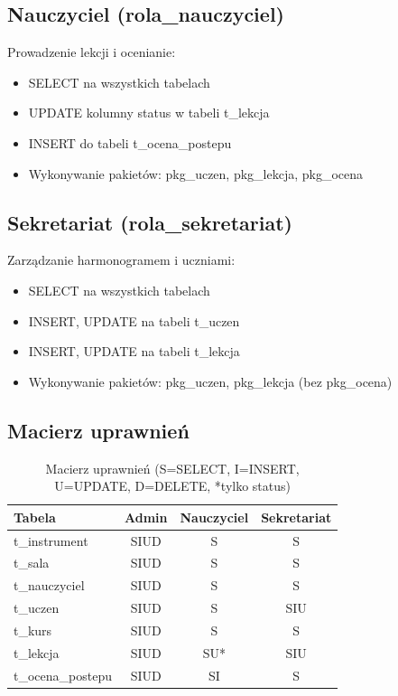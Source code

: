 \documentclass[12pt,a4paper]{article}
\begin{document}
\subsection{Nauczyciel (rola\_nauczyciel)}

Prowadzenie lekcji i ocenianie:
\begin{itemize}[nosep]
    \item SELECT na wszystkich tabelach
    \item UPDATE kolumny status w tabeli t\_lekcja
    \item INSERT do tabeli t\_ocena\_postepu
    \item Wykonywanie pakietów: pkg\_uczen, pkg\_lekcja, pkg\_ocena
\end{itemize}

\subsection{Sekretariat (rola\_sekretariat)}

Zarządzanie harmonogramem i uczniami:
\begin{itemize}[nosep]
    \item SELECT na wszystkich tabelach
    \item INSERT, UPDATE na tabeli t\_uczen
    \item INSERT, UPDATE na tabeli t\_lekcja
    \item Wykonywanie pakietów: pkg\_uczen, pkg\_lekcja (bez pkg\_ocena)
\end{itemize}

\subsection{Macierz uprawnień}

\begin{table}[h]
\centering
\begin{tabular}{|l|c|c|c|}
\hline
\textbf{Tabela} & \textbf{Admin} & \textbf{Nauczyciel} & \textbf{Sekretariat} \\
\hline
t\_instrument & SIUD & S & S \\
t\_sala & SIUD & S & S \\
t\_nauczyciel & SIUD & S & S \\
t\_uczen & SIUD & S & SIU \\
t\_kurs & SIUD & S & S \\
t\_lekcja & SIUD & SU* & SIU \\
t\_ocena\_postepu & SIUD & SI & S \\
\hline
\end{tabular}
\caption{Macierz uprawnień (S=SELECT, I=INSERT, U=UPDATE, D=DELETE, *tylko status)}
\end{table}
\end{document}
